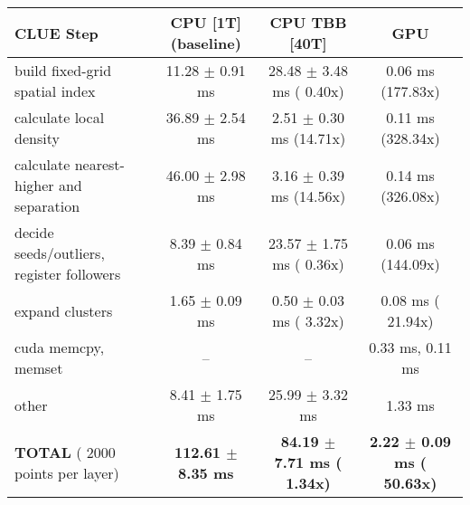     \begin{tabular}{l|c|c|c}
    \hline
    CLUE Step                                 & CPU [1T] (baseline)         & CPU TBB [40T]                         & GPU                       \\ \hline
    build fixed-grid spatial index            &  11.28 $\pm$  0.91 ms       &  28.48 $\pm$  3.48 ms ( 0.40x)        &   0.06 ms (177.83x)       \\
    calculate local density                   &  36.89 $\pm$  2.54 ms       &   2.51 $\pm$  0.30 ms (14.71x)        &   0.11 ms (328.34x)       \\
    calculate nearest-higher and separation   &  46.00 $\pm$  2.98 ms       &   3.16 $\pm$  0.39 ms (14.56x)        &   0.14 ms (326.08x)       \\
    decide seeds/outliers, register followers &   8.39 $\pm$  0.84 ms       &  23.57 $\pm$  1.75 ms ( 0.36x)        &   0.06 ms (144.09x)       \\
    expand clusters                           &   1.65 $\pm$  0.09 ms       &   0.50 $\pm$  0.03 ms ( 3.32x)        &   0.08 ms ( 21.94x)       \\ \hline
    cuda memcpy, memset                       & --                          & --                                    &   0.33 ms,   0.11 ms      \\ 
    other                                     &   8.41 $\pm$  1.75 ms       &  25.99 $\pm$  3.32 ms                 &   1.33 ms                 \\ \hline
    \textbf{TOTAL} ( 2000 points per layer)   & \textbf{112.61 $\pm$  8.35 ms} & \textbf{ 84.19 $\pm$  7.71 ms ( 1.34x)} & \textbf{  2.22 $\pm$  0.09 ms ( 50.63x)}  \\
    \hline 
    \end{tabular}
    \linebreak


